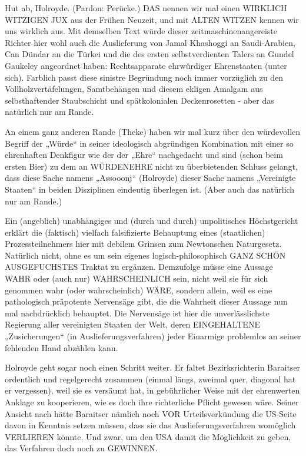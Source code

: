 \begin{multicols}{2}
Hut ab, Holroyde. (Pardon: Perücke.) DAS nennen wir
mal einen WIRKLICH WITZIGEN JUX aus der Frühen
Neuzeit, und mit ALTEN WITZEN kennen wir uns wirklich aus. Mit demselben Text würde dieser zeitmaschinenangereiste Richter hier wohl auch die Auslieferung
von Jamal Khashoggi an Saudi-Arabien, Can Dündar an
die Türkei und die des ersten selbstverdienten Talers an
Gundel Gaukeley angeordnet haben: Rechtsapparate
ehrwürdiger Ehrenstaaten (unter sich). Farblich passt
diese sinistre Begründung noch immer vorzüglich zu
den Vollholzvertäfelungen, Samtbehängen und diesem
ekligen Amalgam aus selbsthaftender Staubschicht und
spätkolonialen Deckenrosetten - aber das natürlich nur
am Rande.

An einem ganz anderen Rande (Theke) haben wir mal
kurz über den würdevollen Begriff der „Würde“ in seiner ideologisch abgründigen Kombination mit einer so
ehrenhaften Denkfigur wie der der „Ehre“ nachgedacht
und sind (schon beim ersten Bier) zu dem an WÜRDENEHRE nicht zu überbietenden Schluss gelangt, dass diese Sache namens „Assooonj“ (Holroyde) dieser Sache
namens „Vereinigte Staaten“ in beiden Disziplinen eindeutig überlegen ist. (Aber auch das natürlich nur am
Rande.)

Ein (angeblich) unabhängiges und (durch und durch)
unpolitisches Höchstgericht erklärt die (faktisch) vielfach falsifizierte Behauptung eines (staatlichen) Prozessteilnehmers hier mit debilem Grinsen zum Newtonschen Naturgesetz. Natürlich nicht, ohne es um sein
eigenes logisch-philosophisch GANZ SCHÖN AUSGEFUCHSTES Traktat zu ergänzen. Demzufolge müsse
eine Aussage WAHR oder (auch nur) WAHRSCHEINLICH sein, nicht weil sie für sich genommen wahr (oder
wahrscheinlich) WÄRE, sondern allein, weil es eine pathologisch präpotente Nervensäge gibt, die die Wahrheit
dieser Aussage nun mal nachdrücklich behauptet. Die
Nervensäge ist hier die unverlässlichste Regierung aller vereinigten Staaten der Welt, deren EINGEHALTENE
„Zusicherungen“ (in Auslieferungsverfahren) jeder Einarmige problemlos an seiner fehlenden Hand abzählen
kann.

Holroyde geht sogar noch einen Schritt weiter. Er faltet
Bezirksrichterin Baraitser ordentlich und regelgerecht
zusammen (einmal längs, zweimal quer, diagonal hat er
vergessen), weil sie es versäumt hat, in gebührlicher Weise mit der ehrenwerten Anklage zu kooperieren, wie es
doch ihre richterliche Pflicht gewesen wäre. Seiner Ansicht nach hätte Baraitser nämlich noch VOR Urteilsverkündung die US-Seite davon in Kenntnis setzen müssen,
dass sie das Auslieferungsverfahren womöglich VERLIEREN könnte. Und zwar, um den USA damit die Möglichkeit zu geben, das Verfahren doch noch zu GEWINNEN.


\end{multicols}
